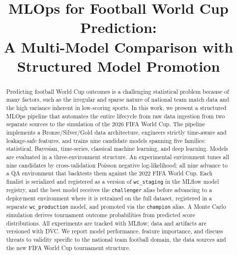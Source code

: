 \documentclass[conference]{IEEEtran}
\begin{document}
\title{MLOps for Football World Cup Prediction:\\
A Multi-Model Comparison with Structured Model Promotion}

\author{
  \and
}

\maketitle

\begin{abstract}
Predicting football World Cup outcomes is a challenging statistical problem because of many 
factors, such as the irregular and sparse nature of national team match data and the high variance inherent in low-scoring sports. 
In this work, we present a structured MLOps pipeline that automates the entire lifecycle 
from raw data ingestion from two separate sources to the simulation of the 2026 FIFA
World Cup. 
The pipeline implements a Bronze/Silver/Gold data architecture, engineers strictly time-aware 
and leakage-safe features, and trains nine candidate models spanning five families: 
statistical, Bayesian, time-series, classical machine learning, and deep learning. 
Models are evaluated in a three-environment structure. An experimental environment tunes 
all nine candidates by cross-validation Poisson negative log-likelihood; all nine advance
to a QA environment that backtests them against the 2022 FIFA World Cup. Each finalist is
serialized and registered as a version of \texttt{wc\_staging} in the MLflow model
registry, and the best model receives the \texttt{challenger} alias before advancing to a
deployment environment where it is retrained on the full dataset, registered in a separate
\texttt{wc\_production} model, and promoted via the \texttt{champion} alias. A Monte Carlo 
simulation derives tournament outcome probabilities from predicted score distributions.
All experiments are tracked with MLflow; data and artifacts are versioned with DVC. We
report model performance, feature importance, and discuss threats to validity specific to
the national team football domain, the data sources and the new FIFA World Cup tournament
structure.
\end{abstract}
\end{document}
